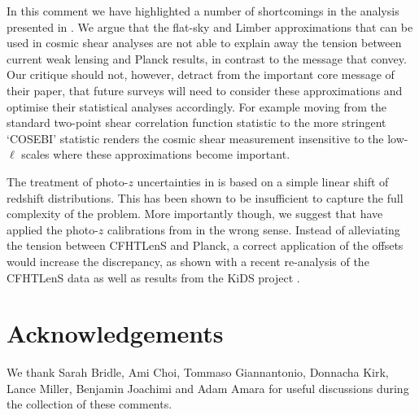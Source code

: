 In this comment we have highlighted a number of shortcomings in the analysis presented in \cite{kitching/etal:2016}.  We argue that the flat-sky and Limber approximations that can be used in cosmic shear analyses are not able to explain away the tension between current weak lensing and Planck results, in contrast to the message that \cite{kitching/etal:2016} convey.  Our critique should not, however, detract from the important core message of their paper, that future surveys will need to consider these approximations and optimise their statistical analyses accordingly.  For example moving from the standard two-point shear correlation function statistic to the more stringent `COSEBI' statistic \citep{schneider/etal:2010} renders the cosmic shear measurement insensitive to the low-$\ell$ scales where these approximations become important.  

The treatment of photo-$z$ uncertainties in \cite{kitching/etal:2016} is based on a simple linear shift of redshift distributions. This has been shown to be insufficient to capture the full complexity of the problem.  More importantly though, we suggest that \cite{kitching/etal:2016} have applied the photo-$z$ calibrations from \cite{choi/etal:2016} in the wrong sense. Instead of alleviating the tension between CFHTLenS and Planck, a correct application of the offsets would increase the discrepancy, as shown with a recent re-analysis of the CFHTLenS data \citep{joudaki/etal:2016} as well as results from the KiDS project \citep{hildebrandt/etal:2016}.

\section{Acknowledgements}
We thank Sarah Bridle, Ami Choi, Tommaso Giannantonio, Donnacha Kirk, Lance Miller, Benjamin Joachimi and Adam Amara for useful discussions during the collection of these comments.